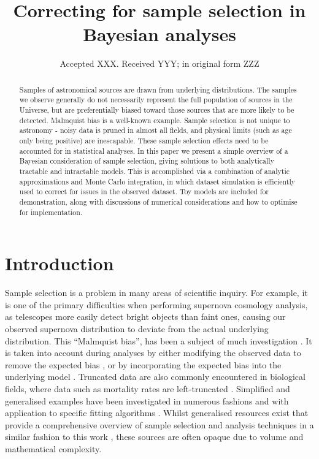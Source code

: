 \documentclass[a4paper,fleqn,usenatbib]{mnras}
\title[Correcting for sample selection in Bayesian analyses]{Correcting for sample selection in Bayesian analyses}
\author[S. R. Hinton et al.]{Samuel R. Hinton,$^{1,2}$\thanks{E-mail: \href{samuelreay@gmail.com}}
	Alex Kim,$^{3}$
	Tamara M. Davis,$^{1,2}$
\\
$^{1}$School of Mathematics and Physics, The University of Queensland, Brisbane, QLD 4072, Australia\\
$^{2}$ARC Centre of Excellence for All-sky Astrophysics (CAASTRO)\\
$^{3}$Physics Division, Lawrence Berkeley National Laboratory, 1 Cyclotron Road, Berkeley, CA 94720,
USA
}
\date{Accepted XXX. Received YYY; in original form ZZZ}
\newcommand{\green}{\color{ForestGreen}}
\begin{document}
\linenumbers


\label{firstpage}
\pagerange{\pageref{firstpage}--\pageref{lastpage}}
\maketitle





\begin{abstract}
{\green Samples of astronomical sources are drawn from underlying distributions. The samples we observe generally do not necessarily represent the full population of sources in the Universe, but are preferentially biased toward those sources that are more likely to be detected.  Malmquist bias is a well-known example. Sample selection is not unique to astronomy - noisy data is pruned in almost all fields, and physical limits  (such as age only being positive) are inescapable. }These sample selection effects need to be accounted for in statistical analyses. In this paper we present a simple overview of a Bayesian consideration of sample selection, giving solutions to both analytically tractable and intractable models. This is accomplished via a combination of analytic approximations and Monte Carlo integration, in which dataset simulation is efficiently used to correct for issues in the observed dataset. Toy models are included for demonstration, along with discussions of numerical considerations and how to optimise for implementation.
\end{abstract}








\section{Introduction}

Sample selection is a problem in many areas of scientific inquiry. For example, it is one of the primary difficulties when performing supernova cosmology analysis, as telescopes more easily detect bright objects than faint ones, causing our observed supernova distribution to deviate from the actual underlying distribution. This  ``Malmquist bias'', has been a subject of much investigation \citep{Butkevich2005}. It is taken into account during analyses by either modifying the observed data to remove the expected bias \citep{BetouleKessler2014, ConleyGuySullivan2011}, or by incorporating the expected bias into the underlying model \citep{Rubin2015}. Truncated data are also commonly encountered in biological fields, where data such as mortality rates are left-truncated \citep{JANE1898}. Simplified and generalised examples have been investigated in numerous fashions \citep{woodroofe1985estimating, Gull1989bayesian, grogger1991models, o1995truncated} and with application to specific fitting algorithms \citep{Gelfand1992}. Whilst generalised resources exist that provide a comprehensive overview of sample selection and analysis techniques in a similar fashion to this work \citep{klein2005survival}, these sources are often opaque due to volume and mathematical complexity. 
\end{document}
